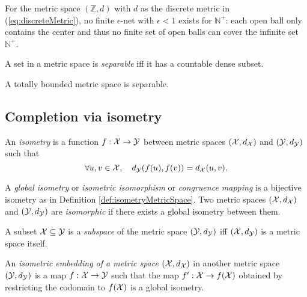 \begin{exm}
  For the metric space $(\mathbb{Z},d)$
  with $d$ as the discrete metric in (\ref{eq:discreteMetric}),
  no finite $\epsilon$-net with $\epsilon<1$
  exists for $\mathbb{N}^+$:
  each open ball only contains the center
  and thus no finite set of open balls
  can cover the infinite set $\mathbb{N}^+$.
\end{exm}

\begin{defn}
  \label{def:separableMetricSpace}
  A set in a metric space is \emph{separable}
  iff it has a countable dense subset.
\end{defn}


\begin{lem}
  A totally bounded metric space is separable.
\end{lem}


\subsection{Completion via isometry}
\label{sec:compl-via-isom}

\begin{defn}
  \label{def:isometryMetricSpace}
  An \emph{isometry} is a function $f: {\cal X}\rightarrow{\cal Y}$
  between metric spaces $({\cal X}, d_{{\cal X}})$
  and $({\cal Y}, d_{{\cal Y}})$
  such that
  \begin{equation}
    \label{eq:isometryMetricSpace}
    \forall u,v\in {\cal X},\quad
    d_{{\cal Y}}(f(u),f(v)) = d_{{\cal X}}(u,v).
  \end{equation}
\end{defn}


\begin{defn}
  \label{def:isometricIsomorphism}
  A \emph{global isometry} or \emph{isometric isomorphism}
  or \emph{congruence mapping}
  is a bijective isometry
  as in Definition \ref{def:isometryMetricSpace}.
  Two metric spaces $({\cal X}, d_{{\cal X}})$
  and $({\cal Y}, d_{{\cal Y}})$
  are \emph{isomorphic} if there exists
  a global isometry between them.
\end{defn}


\begin{defn}
  \label{def:subspaceMetric}
  A subset ${\cal X}\subseteq {\cal Y}$
  is a \emph{subspace} of the metric space
  $({\cal Y}, d_{{\cal Y}})$ iff
  $({\cal X}, d_{{\cal Y}})$ is a metric space itself.
\end{defn}

\begin{defn}
  \label{def:isometricEmbedding}
  An \emph{isometric embedding of
  a metric space} $({\cal X}, d_{{\cal X}})$
  in another metric space
  $({\cal Y}, d_{{\cal Y}})$
  is a map $f: {\cal X}\rightarrow {\cal Y}$
  such that the map $f': {\cal X}\rightarrow f({\cal X})$
  obtained by restricting the codomain to $f({\cal X})$
  is a global isometry.
\end{defn}

